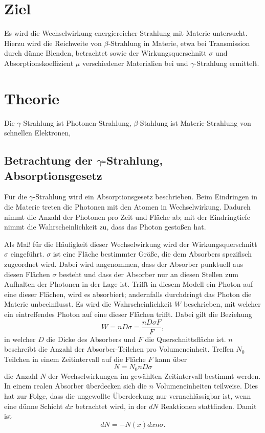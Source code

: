 \section{Ziel}
\label{sec:Ziel}
Es wird die Wechselwirkung energiereicher Strahlung mit Materie untersucht.
Hierzu wird die Reichweite von $\beta$-Strahlung in Materie, etwa bei Transmission durch dünne Blenden, betrachtet sowie der Wirkungsquerschnitt $\sigma$ und Absorptionskoeffizient $\mu$ verschiedener Materialien bei und $\gamma$-Strahlung ermittelt.

\section{Theorie}
\label{sec:Theorie}
Die $\gamma$-Strahlung ist Photonen-Strahlung, $\beta$-Stahlung ist Materie-Strahlung von schnellen Elektronen, 


\subsection{Betrachtung der \texorpdfstring{$\gamma$}{Gamma}-Strahlung, Absorptionsgesetz}
\label{sec:gamma}
Für die $\gamma$-Strahlung wird ein Absorptionsgesetz beschrieben.
Beim Eindringen in die Materie treten die Photonen mit den Atomen in Wechselwirkung. 
Dadurch nimmt die Anzahl der Photonen pro Zeit und Fläche ab; mit der Eindringtiefe nimmt die Wahrscheinlichkeit zu, 
dass das Photon gestoßen hat.

Als Maß für die Häufigkeit dieser Wechselwirkung wird der Wirkungsquerschnitt $\sigma$ eingeführt.
$\sigma$ ist eine Fläche bestimmter Größe, die dem Absorbers spezifisch zugeordnet wird. 
Dabei wird angenommen, dass der Absorber punktuell aus diesen Flächen $\sigma$ besteht und dass der Absorber nur an diesen Stellen zum Aufhalten der Photonen in der Lage ist.
Trifft in diesem Modell ein Photon auf eine dieser Flächen, wird es absorbiert; andernfalls durchdringt das Photon die Materie unbeeinflusst.
Es wird die Wahrscheinlichkeit $W$ beschrieben, mit welcher ein eintreffendes Photon auf eine dieser Flächen trifft. 
Dabei gilt die Beziehung 
\begin{equation}
	W=n D \sigma =\frac{n D \sigma F}{F},
\end{equation}
in welcher $D$ die Dicke des Absorbers und $F$ die Querschnittsfläche ist. 
$n$ beschreibt die Anzahl der Absorber-Teilchen pro Volumeneinheit.
Treffen $N_0$ Teilchen in einem Zeitintervall auf die Fläche $F$ kann über
\begin{equation}
	N=N_0 n D \sigma
\end{equation}
die Anzahl $N$ der Wechselwirkungen im gewählten Zeitintervall bestimmt werden. 
In einem realen Absorber überdecken sich die $n$ Volumeneinheiten teilweise. 
Dies hat zur Folge, dass die ungewollte Überdeckung nur vernachlässigbar ist, wenn eine dünne Schicht $dx$ betrachtet wird, in der $dN$ Reaktionen stattfinden. 
Damit ist
\begin{equation}
	dN=-N(x) dx n \sigma.
	\label{eq:Absorptionsgesetz_Vorstufe}
\end{equation}

